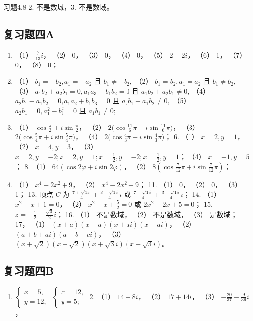 习题4.8 2. 不是数域，3. 不是数域。

\subsection{复习题四A}

\begin{enumerate}
\item
  （1） \(\frac{7}{13} i\)， （2） 0， （3） 0， （4） 0， （5）
  \(2 - 2i\)， （6） 1， （7） 0， （8） 0；
\item
  （1） \(b_{1} = -b_{2}, a_{1} = -a_{2}\) 且 \(b_{1} \neq -b_{2},\)
  （2） \(b_{1} = b_{2}, a_{1} = a_{2}\) 且 \(b_{1} \neq b_{2},\) （3）
  \(a_{1}b_{2} + a_{2}b_{1} = 0, a_{1}a_{3} - b_{1}b_{2} = 0\) 且
  \(a_{1}b_{2} + a_{2}b_{1} \neq 0,\) （4）
  \(a_{2}b_{1} - a_{1}b_{2} = 0, a_{1}a_{2} + b_{1}b_{3} = 0\) 且
  \(a_{2}b_{1} - a_{1}b_{2} \neq 0,\) （5）
  \(a_{2}b_{1} = 0, a_{1}^{2} - b_{1}^{2} = 0\) 且
  \(a_{1}b_{1} \neq 0;\)
\item
  （1） \(\cos \frac{\pi}{2} + i \sin \frac{\pi}{2}\)，
  （2） \(2\bigl(\cos \frac{11}{6}\pi + i \sin \frac{11}{6}\pi\bigr)\)，
  （3） \(2\bigl(\cos \frac{5}{4}\pi + i \sin \frac{5}{4}\pi\bigr)\)，
  （4） \(2\bigl(\cos \frac{4}{3}\pi + i \sin \frac{4}{3}\pi\bigr)\)；
  6. （1） \(x = 2, y = 1\)， （2） \(x = 4, y = 3\)， （3）
  \(x = 2, y = -2; x = 2, y = 1; x = \frac{1}{2}, y = -2; x = \frac{1}{2}, y = 1\)；
  （4） \(x = -1, y = 5\)； 8. （1）
  \(64(\cos 2\varphi + i \sin 2\varphi)\)， （2）
  \(8\left(\cos \frac{7}{12}\pi + i \sin \frac{7}{12}\pi\right)\)；
\item
  （1） \(x^{4} + 2x^{2} + 9\)， （2） \(x^{4} - 2x^{2} + 9\)； 11.
  （1） 0， （2） 0， （3） 1； 13. 顶点 \(C\) 为
  \(\frac{7 + \sqrt{15}}{4} + \frac{3 - \sqrt{15}}{4}i\) 或
  \(\frac{7 - \sqrt{15}}{4} + \frac{3 + \sqrt{15}}{4}i\)； 14. （1）
  \(x^{2} - x + 1 = 0\)， （2） \(x^{2} - x + \frac{5}{2} = 0\) 或
  \(2x^{2} - 2x + 5 = 0\)； 15.
  \(z = -\frac{1}{2} + \frac{\sqrt{3}}{2}i\)； 16. （1） 不是数域，
  （2） 不是数域， （3） 是数域； 17， （1）
  \((x + a)(x - a)(x + ai)(x - ai)\)， （2）
  \((a + b + ai)(a + b - ci)\)， （3）
  \((x + \sqrt{2})(x - \sqrt{2})(x + \sqrt{3}i)(x - \sqrt{3}i)\)。
\end{enumerate}

\subsection{复习题四B}

\begin{enumerate}
\item
  \(\left\{ \begin{array}{l} x = 5, \\ y = 12, \end{array} \right.\)
  \(\left\{ \begin{array}{l} x = 12, \\ y = 5; \end{array} \right.\) 2.
  （1） \(14 - 8i\)， （2） \(17 + 14i\)， （3）
  \(-\frac{20}{37} - \frac{9}{39}i\)，
\end{enumerate}

